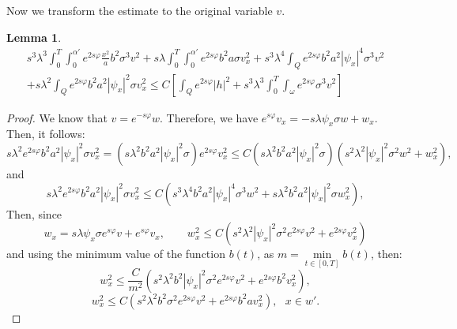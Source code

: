 \documentclass[11pt,oneside,a4papper]{osajnl}
\newtheorem{lema}{Lemma}
\begin{document}
Now we transform the estimate to the original variable $v$.
\begin{lema}\label{lemaA10}
	\begin{multline*}
		s^3 \lambda^3 \int_0^T \int_0^{\alpha'} e^{2s\varphi} \frac{x^2}{a} b^2\sigma^3 v^2 +s \lambda \int_0^T \int_0^{\alpha'} e^{2s\varphi} b^2 a \sigma v_x^2+s^3 \lambda^4 \int_Q e^{2s\varphi}b^2 a^2|\psi_x|^4 \sigma^3 v^2\\
		+s \lambda^2 \int_Q e^{2s\varphi}b^2 a^2 |\psi_x|^2 \sigma v_x^2 
		\leq C\left[ \int_Q e^{2s\varphi} |h|^2 + s^3\lambda^3 \int_0^T \int_{\omega} e^{2s\varphi}\sigma^3 v^2  \right]
	\end{multline*}
\end{lema}
\begin{proof}
	We know that  $v=e^{-s\varphi}w $. Therefore, we have
	$e^{s\varphi}v_x=-s\lambda\psi_x\sigma w+w_x$. 
	Then, it follows:
	$$s \lambda^2 e^{2s\varphi}b^2 a^2 |\psi_x|^2 \sigma v_x^2=\left( s \lambda^2 b^2 a^2|\psi_x|^2\sigma\right)e^{2s\varphi}v_x^2\leq C\left( s \lambda^2 b^2 a^2|\psi_x|^2\sigma\right)\left(  s^2\lambda^2|\psi_x|^2\sigma^2 w^2+w_x^2 \right),$$
	and
	$$s \lambda^2 e^{2s\varphi}b^2 a^2 |\psi_x|^2 \sigma v_x^2\leq  C\left( s^3 \lambda^4 b^2 a^2|\psi_x|^4\sigma^3 w^2 + s \lambda^2 b^2 a^2|\psi_x|^2\sigma w_x^2\right), $$
	Then, since
	$$w_x=s\lambda\psi_x\sigma e^{s\varphi}v+e^{s\varphi}v_x, \qquad w_x^2\leq C \left(  s^2\lambda^2|\psi_x|^2\sigma^2 e^{2s\varphi}v^2+ e^{2s\varphi}v_x^2\right)$$
	and using the minimum value of the function $b(t)$, as $m=\min\limits_{t\in [0,T]} b(t)$, then:
	$$w_x^2\leq \frac{C}{m^2} \left(  s^2\lambda^2b^2|\psi_x|^2\sigma^2 e^{2s\varphi}v^2+ e^{2s\varphi}b^2v_x^2\right),$$
	$$w_x^2\leq C \left(  s^2\lambda^2b^2\sigma^2 e^{2s\varphi}v^2+ e^{2s\varphi}b^2av_x^2\right), \ \ \ x\in w'.$$

\end{proof}
\end{document}

